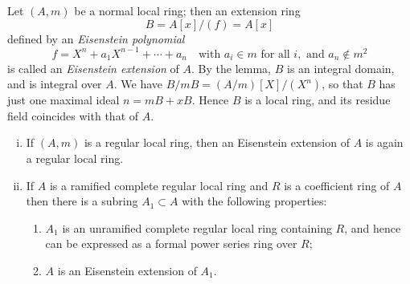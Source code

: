 Let $(A, m)$ be a normal local ring; then an extension ring
\[
  B = A[x]/(f) = A[x]
\]
defined by an \emph{Eisenstein polynomial}
\[
  f = X^n + a_1X^{n-1} + \cdots + a_n \quad \text{with } a_i \in m \text{ for all } i,
      \text{ and } a_n \notin m^2
\]
is called an \emph{Eisenstein extension} of $A$. By the lemma, $B$ is an integral domain,
and is integral over $A$. We have $B/mB = (A/m)[X]/(X^n)$, so that $B$ has just one
maximal ideal $n = mB + xB$. Hence $B$ is a local ring, and its residue field
coincides with that of $A$.

\begin{theorem}\label{thm:29.9}
\begin{enumerate}[(i)]
  \item If $(A, m)$ is a regular local ring, then an Eisenstein extension of $A$ is
        again a regular local ring.
  \item If $A$ is a ramified complete regular local ring and $R$ is a coefficient
        ring of $A$ then there is a subring $A_1 \subset A$ with the following
        properties:
        \begin{enumerate}[(1)]
          \item $A_1$ is an unramified complete regular local ring containing $R$,
                and hence can be expressed as a formal power series ring over $R$;
          \item $A$ is an Eisenstein extension of $A_1$.
        \end{enumerate}
\end{enumerate}
\end{theorem}

